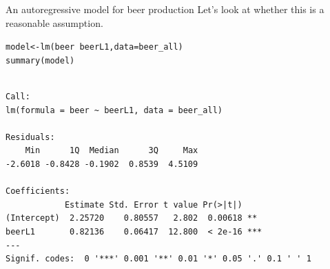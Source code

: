 \documentclass{beamer}\usepackage[]{graphicx}\usepackage[]{color}
\makeatletter
\newcommand{\hlnum}[1]{\textcolor[rgb]{0.824,0.412,0.118}{#1}}%
\newcommand{\hlstr}[1]{\textcolor[rgb]{1,0.894,0.71}{#1}}%
\newcommand{\hlcom}[1]{\textcolor[rgb]{0.824,0.706,0.549}{#1}}%
\newcommand{\hlopt}[1]{\textcolor[rgb]{1,0.894,0.769}{#1}}%
\newcommand{\hlstd}[1]{\textcolor[rgb]{1,0.894,0.769}{#1}}%
\newcommand{\hlkwb}[1]{\textcolor[rgb]{0.804,0.776,0.451}{#1}}%
\newcommand{\hlkwc}[1]{\textcolor[rgb]{0.78,0.941,0.545}{#1}}%
\newcommand{\hlkwd}[1]{\textcolor[rgb]{1,0.78,0.769}{#1}}%
\newenvironment{kframe}{%
 \def\at@end@of@kframe{}%
 \ifinner\ifhmode%
  \def\at@end@of@kframe{\end{minipage}}%
  \begin{minipage}{\columnwidth}%
 \fi\fi%
 \def\FrameCommand##1{\hskip\@totalleftmargin \hskip-\fboxsep
 \colorbox{shadecolor}{##1}\hskip-\fboxsep
     \hskip-\linewidth \hskip-\@totalleftmargin \hskip\columnwidth}%
 \MakeFramed {\advance\hsize-\width
   \@totalleftmargin\z@ \linewidth\hsize
   \@setminipage}}%
 {\par\unskip\endMakeFramed%
 \at@end@of@kframe}
\newenvironment{knitrout}{}{} %
\makeatother
\begin{document}
\begin{darkframes}
\begin{frame}[fragile]{An autoregressive model for beer production}
   Let's look at whether this is a reasonable assumption.
\end{frame}

\begin{frame}[fragile]%
      \fontsize{8}{8}\selectfont
\begin{knitrout}
\begin{kframe}
\begin{alltt}
\hlstd{model} \hlkwb{<-} \hlkwd{lm}\hlstd{(beer} \hlopt{~} \hlstd{beerL1,} \hlkwc{data}\hlstd{=beer_all)}
\hlkwd{summary}\hlstd{(model)}
\end{alltt}
\begin{verbatim}

Call:
lm(formula = beer ~ beerL1, data = beer_all)

Residuals:
    Min      1Q  Median      3Q     Max 
-2.6018 -0.8428 -0.1902  0.8539  4.5109 

Coefficients:
            Estimate Std. Error t value Pr(>|t|)    
(Intercept)  2.25720    0.80557   2.802  0.00618 ** 
beerL1       0.82136    0.06417  12.800  < 2e-16 ***
---
Signif. codes:  0 '***' 0.001 '**' 0.01 '*' 0.05 '.' 0.1 ' ' 1


\end{verbatim}
\end{kframe}
\end{knitrout}
\end{frame}
\end{darkframes}
\end{document}
